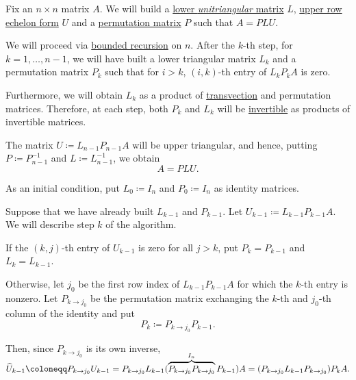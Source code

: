 \begin{algorithm}\label{alg:plu_decomposition}
  Fix an \( n \times n \) matrix \( A \). We will build a \hyperref[def:triangular_matrix]{lower \emph{unitriangular} matrix} \( L \), \hyperref[def:upper_row_echelon_form]{upper row echelon form} \( U \) and a \hyperref[def:elementary_matrix/permutation]{permutation matrix} \( P \) such that \( A = PLU \).

  We will proceed via \hyperref[thm:transfinite_recursion]{bounded recursion} on \( n \). After the \( k \)-th step, for \( k = 1, \ldots, n - 1 \), we will have built a lower triangular matrix \( L_k \) and a permutation matrix \( P_k \) such that for \( i > k \), \( (i, k) \)-th entry of \( L_k P_k A \) is zero.

  Furthermore, we will obtain \( L_k \) as a product of \hyperref[def:elementary_matrix/transvection]{transvection} and permutation matrices. Therefore, at each step, both \( P_k \) and \( L_k \) will be \hyperref[def:inverse_matrix]{invertible} as products of invertible matrices.

  The matrix \( U \coloneqq L_{n-1} P_{n-1} A \) will be upper triangular, and hence, putting \( P \coloneqq P_{n-1}^{-1} \) and \( L \coloneqq L_{n-1}^{-1} \), we obtain
  \begin{equation*}
    A = PLU.
  \end{equation*}

  \begin{thmenum}
     As an initial condition, put \( L_0 \coloneqq I_n \) and \( P_0 \coloneqq I_n \) as identity matrices.

     Suppose that we have already built \( L_{k-1} \) and \( P_{k-1} \). Let \( U_{k-1} \coloneqq L_{k-1} P_{k-1} A \). We will describe step \( k \) of the algorithm.

    If the \( (k, j) \)-th entry of \( U_{k-1} \) is zero for all \( j > k \), put \( P_k = P_{k-1} \) and \( L_k = L_{k-1} \).

    Otherwise, let \( j_0 \) be the first row index of \( L_{k-1} P_{k-1} A \) for which the \( k \)-th entry is nonzero. Let \( P_{k \to j_0} \) be the permutation matrix exchanging the \( k \)-th and \( j_0 \)-th column of the identity and put
    \begin{equation*}
      P_k \coloneqq P_{k \to j_0} P_{k-1}.
    \end{equation*}

    Then, since \( P_{k \to j_0} \) is its own inverse,
    \begin{equation*}
      \widehat{U}_{k-1} \coloneqq P_{k \to j_0} U_{k-1} = P_{k \to j_0} L_{k-1} (\smash{ \overbrace{P_{k \to j_0} P_{k \to j_0}}^{I_n} P_{k-1}) A = (P_{k \to j_0} L_{k-1} P_{k \to j_0}) } P_k A.
    \end{equation*}


\end{thmenum}
\end{algorithm}

